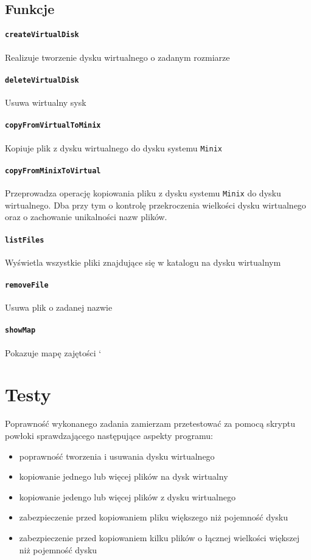 \documentclass[12pt,a4paper]{article}
\begin{document}
\subsection{Funkcje}
\paragraph{\texttt{createVirtualDisk}}
Realizuje tworzenie dysku wirtualnego o zadanym rozmiarze
\paragraph{\texttt{deleteVirtualDisk}}
Usuwa wirtualny sysk
\paragraph{\texttt{copyFromVirtualToMinix}}
Kopiuje plik z dysku wirtualnego do dysku systemu \texttt{Minix}
\paragraph{\texttt{copyFromMinixToVirtual}}
Przeprowadza operację kopiowania pliku z dysku systemu \texttt{Minix} do dysku wirtualnego. Dba przy tym o kontrolę przekroczenia wielkości dysku wirtualnego oraz o zachowanie unikalności nazw plików.
\paragraph{\texttt{listFiles}}
Wyświetla wszystkie pliki znajdujące się w katalogu na dysku wirtualnym
\paragraph{\texttt{removeFile}}
Usuwa plik o zadanej nazwie 
\paragraph{\texttt{showMap}}
Pokazuje mapę zajętości
`
\section{Testy}
Poprawność wykonanego zadania zamierzam przetestować za pomocą skryptu powłoki sprawdzającego następujące aspekty programu:
\begin{itemize}
\item poprawność tworzenia i usuwania dysku wirtualnego
\item kopiowanie jednego lub więcej plików na dysk wirtualny
\item kopiowanie jedengo lub więcej plików z dysku wirtualnego
\item zabezpieczenie przed kopiowaniem pliku większego niż pojemność dysku
\item zabezpieczenie przed kopiowaniem kilku plików o łącznej wielkości większej niż pojemność dysku
\end{itemize}
\end{document}
